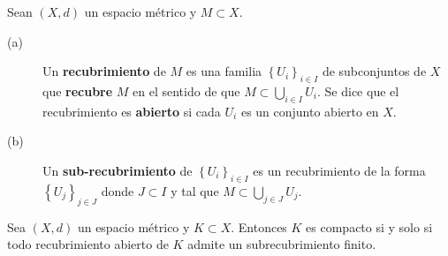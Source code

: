 \begin{definition}[Recubrimiento]
Sean $\displaystyle \left(X,d\right) $ un espacio métrico y $\displaystyle M \subset X $. 
\begin{description}
	\item[(a)] Un \textbf{recubrimiento} de $\displaystyle M $ es una familia $\displaystyle \left\{ U_{i}\right\} _{i \in I} $ de subconjuntos de $\displaystyle X $ que \textbf{recubre} $\displaystyle M $ en el sentido de que $\displaystyle M \subset \bigcup_{i \in I}U_{i} $. Se dice que el recubrimiento es \textbf{abierto} si cada $\displaystyle U_{i} $ es un conjunto abierto en $\displaystyle X $.
	\item[(b)] Un \textbf{sub-recubrimiento} de $\displaystyle \left\{ U_{i}\right\} _{i \in I} $ es un recubrimiento de la forma $\displaystyle \left\{ U_{j}\right\} _{j \in J} $ donde $\displaystyle J \subset I $ y tal que $\displaystyle M \subset \bigcup_{j \in J}U_{j} $.
\end{description}
\end{definition}
\begin{theorem}
Sea $\displaystyle \left(X,d\right) $ un espacio métrico y $\displaystyle K \subset X $. Entonces $\displaystyle K $ es compacto si y solo si todo recubrimiento abierto de $\displaystyle K $ admite un subrecubrimiento finito.
\end{theorem}
